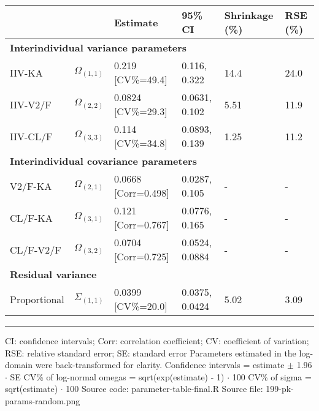 \setlength{\tabcolsep}{5pt} 
\begin{threeparttable}
\renewcommand{\arraystretch}{1.3}
\begin{tabular}[h]{llllll}
\hline
 &  & Estimate & 95\% CI & Shrinkage (\%) & RSE (\%) \\
\hline
\multicolumn{6}{l}{\textbf{Interindividual variance parameters}}\\%
IIV-KA & $\Omega_{(1,1)}$ & 0.219 [CV\%=49.4] & 0.116, 0.322 & 14.4 & 24.0 \\
IIV-V2/F & $\Omega_{(2,2)}$ & 0.0824 [CV\%=29.3] & 0.0631, 0.102 & 5.51 & 11.9 \\
IIV-CL/F & $\Omega_{(3,3)}$ & 0.114 [CV\%=34.8] & 0.0893, 0.139 & 1.25 & 11.2 \\
\hline \multicolumn{6}{l}{\textbf{Interindividual covariance parameters}}\\%
V2/F-KA & $\Omega_{(2,1)}$ & 0.0668 [Corr=0.498] & 0.0287, 0.105 & - & - \\
CL/F-KA & $\Omega_{(3,1)}$ & 0.121 [Corr=0.767] & 0.0776, 0.165 & - & - \\
CL/F-V2/F & $\Omega_{(3,2)}$ & 0.0704 [Corr=0.725] & 0.0524, 0.0884 & - & - \\
\hline \multicolumn{6}{l}{\textbf{Residual variance}}\\%
Proportional & $\Sigma_{(1,1)}$ & 0.0399 [CV\%=20.0] & 0.0375, 0.0424 & 5.02 & 3.09 \\
\hline
\end{tabular}
\end{threeparttable}
 
\vspace{0.67cm}
 
\begin{minipage}{1\linewidth}
\linespread{1.1}\selectfont
\rule{1\linewidth}{0.4pt}
\vspace{0.02cm}
CI: confidence intervals; Corr: correlation coefficient; CV: coefficient of variation; RSE: relative standard error; SE: standard error \newline
Parameters estimated in the log-domain were back-transformed for clarity. \newline
Confidence intervals = estimate $\pm$ 1.96 $\cdot$ SE \newline
CV\% of log-normal omegas = sqrt(exp(estimate) - 1) $\cdot$ 100 \newline
CV\% of sigma = sqrt(estimate) $\cdot$ 100 \newline
Source code: parameter-table-final.R \newline
Source file: 199-pk-params-random.png \newline
\end{minipage}
